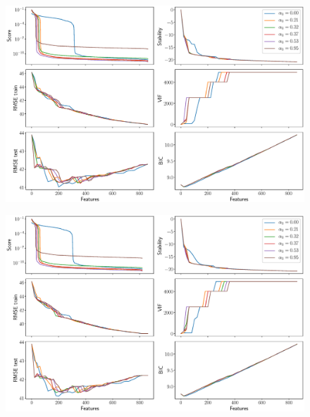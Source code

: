 \documentclass[12pt,twoside]{article}
\begin{document}
\begin{figure}
	\includegraphics[width=\linewidth]{figs/ecog_45_metrics.eps}
	\caption{}
\end{figure}

\begin{figure}
	\includegraphics[width=\linewidth]{figs/ecog_90_metrics.eps}
	\caption{}
\end{figure}
\end{document}
